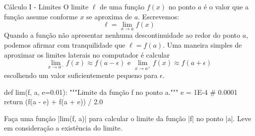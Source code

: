     \begin{problem}[p:calculo:1]{Cálculo I - Limites}
	O limite $\ell$ de uma função $f(x)$ no ponto $a$ é o valor que a função assume conforme $x$ se aproxima de $a$. Escrevemos:
		$$\ell = \lim_{x \to a} f(x)$$
	Quando a função não apresentar nenhuma descontinuidade ao redor do ponto $a$, podemos afirmar com tranquilidade que $\ell = f(a)$. Uma maneira simples de aproximar os limites laterais no computador é calcular
		$$\lim_{x \to a^{-}}f(x) \approx f(a - \epsilon) \text{ e } \lim_{x \to a^{+}}f(x) \approx f(a + \epsilon)$$
	escolhendo um valor suficientemente pequeno para $\epsilon$. 

	\begin{lstpython}
	def lim(f, a, e=0.01):
		"""Limite da função f no ponto a."""
		e = 1E-4 # 0.0001
		return (f(a - e) + f(a + e)) / 2.0
	\end{lstpython}

	\proposal Faça uma função |lim(f, a)| para calcular o limite da função |f| no ponto |a|. Leve em consideração a existência do limite.
	\end{problem}

